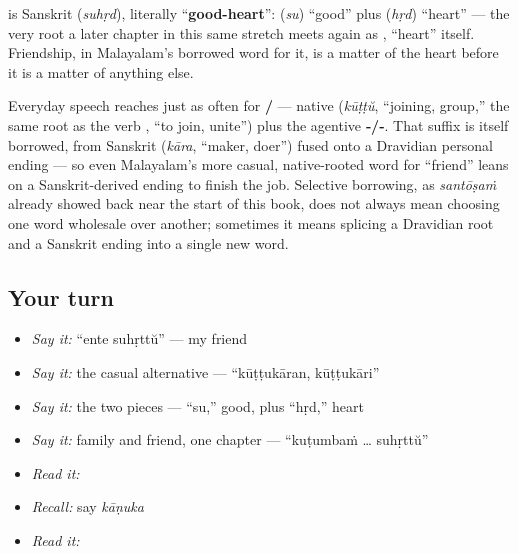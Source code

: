 \begin{cousinweb}
\textbf{} is Sanskrit \textbf{} (\emph{suhṛd}), literally \textquotedblleft{}\textbf{good-heart}\textquotedblright{}: \textbf{} (\emph{su}) \textquotedblleft{}good\textquotedblright{} plus \textbf{} (\emph{hṛd}) \textquotedblleft{}heart\textquotedblright{} — the very root a later chapter in this same stretch meets again as \textbf{}, \textquotedblleft{}heart\textquotedblright{} itself. Friendship, in Malayalam's borrowed word for it, is a matter of the heart before it is a matter of anything else.

Everyday speech reaches just as often for \textbf{/} — native \textbf{} (\emph{kūṭṭŭ}, \textquotedblleft{}joining, group,\textquotedblright{} the same root as the verb \textbf{}, \textquotedblleft{}to join, unite\textquotedblright{}) plus the agentive \textbf{‑/‑}. That suffix is itself borrowed, from Sanskrit \textbf{} (\emph{kāra}, \textquotedblleft{}maker, doer\textquotedblright{}) fused onto a Dravidian personal ending — so even Malayalam's more casual, native-rooted word for \textquotedblleft{}friend\textquotedblright{} leans on a Sanskrit-derived ending to finish the job. Selective borrowing, as \emph{santōṣaṁ} already showed back near the start of this book, does not always mean choosing one word wholesale over another; sometimes it means splicing a Dravidian root and a Sanskrit ending into a single new word.
\end{cousinweb}

\subsection*{Your turn}
\begin{itemize}
\raggedright
  \item \emph{Say it:} \textquotedblleft{}ente suhṛttŭ\textquotedblright{} — my friend
  \item \emph{Say it:} the casual alternative — \textquotedblleft{}kūṭṭukāran, kūṭṭukāri\textquotedblright{}
  \item \emph{Say it:} the two pieces — \textquotedblleft{}su,\textquotedblright{} good, plus \textquotedblleft{}hṛd,\textquotedblright{} heart
  \item \emph{Say it:} family and friend, one chapter — \textquotedblleft{}kuṭumbaṁ … suhṛttŭ\textquotedblright{}
  \item \emph{Read it:} \textbf{}
  \item \emph{Recall:} say \emph{kāṇuka}
  \item \emph{Read it:} \textbf{}
\end{itemize}

